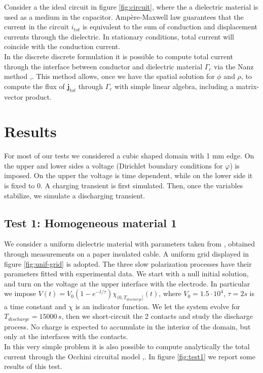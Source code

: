 \documentclass[11pt,a4paper]{article}
\begin{document}
Consider a the ideal circuit in figure \ref{fig:circuit}, where the a dielectric material is used as a medium in the capacitor. Ampère-Maxwell law guarantees that the current in the circuit \(i_{tot}\) is equivalent to the sum of conduction and displacement currents through the dielectric. In stationary conditions, total current will coincide with the conduction current.\\
In the discrete discrete formulation it is possible to compute total current through the interface between conductor and dielectric material \(\Gamma_c\) via the Nanz method \cite{Nanz},\cite{HUGHES2000467}. This method allows, once we have the spatial solution for \(\phi\) and \(\rho\), to compute the flux of \(\mathbf{j}_{tot}\) through \(\Gamma_{c}\) with simple linear algebra, including a matrix-vector product. 

\section{Results}
For most of our tests we considered a cubic shaped domain with 1 mm edge. On the upper and lower sides a voltage (Dirichlet boundary conditions for \(\varphi\)) is imposed. On the upper the voltage is time dependent, while on the lower side it is fixed to 0. A charging transient is first simulated. Then, once the variables stabilize, we simulate a discharging transient.
\subsection{Test 1: Homogeneous material 1}
We consider a uniform dielectric material with parameters taken from \cite{en14248323}, obtained through measurements on a paper insulated cable. A uniform grid displayed in figure \ref{fig:unif-grid} is adopted. The three slow polarization processes have their parameters fitted with experimental data. We start with a null initial solution, and turn on the voltage at the upper interface with the electrode. In particular we impose \(V(t)=V_0(1-e^{-t/\tau})\chi_{(0,T_{discharge}]}(t)\), where \(V_0 = 1.5\cdot 10^4\), \(\tau=2 s\) is a time constant and \(\chi\) is an indicator function. We let the system evolve for \(T_{discharge}=15000\,s\), then we short-circuit the 2 contacts and study the discharge process. No charge is expected to accumulate in the interior of the domain, but only at the interfaces with the contacts.\\
In this very simple problem it is also possible to compute analytically the total current through the Occhini circuital model \cite{4073280},\cite{en14248323}. In figure \ref{fig:test1} we report some results of this test.
\end{document}
